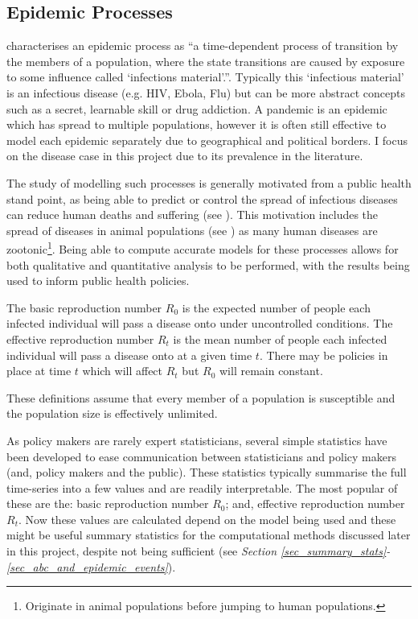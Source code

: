 \documentclass[11pt,a4paper]{article}
\theoremstyle{break}
\begin{document}
\subsection{Epidemic Processes}

  \par \cite[]{epidemic_process_in_an_open_population} characterises an epidemic process as ``a time-dependent process of transition by the members of a population, where the state transitions are caused by exposure to some influence called `infections material'.''. Typically this `infectious material' is an infectious disease (e.g. HIV, Ebola, Flu) but can be more abstract concepts such as a secret, learnable skill or drug addiction. A pandemic is an epidemic which has spread to multiple populations, however it is often still effective to model each epidemic separately due to geographical and political borders. I focus on the disease case in this project due to its prevalence in the literature.

  \par The study of modelling such processes is generally motivated from a public health stand point, as being able to predict or control the spread of infectious diseases can reduce human deaths and suffering (see \cite[]{mitigation_measures_for_pandemic_influence_in_italy}). This motivation includes the spread of diseases in animal populations (see \cite[]{dynamic_model_of_bovine_tb_spread_and_control_in_great_britain}) as many human diseases are zootonic\footnote{Originate in animal populations before jumping to human populations.}. Being able to compute accurate models for these processes allows for both qualitative and quantitative analysis to be performed, with the results being used to inform public health policies.

  \begin{box_definition}
    The basic reproduction number $R_0$ is the expected number of people each infected individual will pass a disease onto under uncontrolled conditions. The effective reproduction number $R_t$ is the mean number of people each infected individual will pass a disease onto at a given time $t$. There may be policies in place at time $t$ which will affect $R_t$ but $R_0$ will remain constant.
    \par These definitions assume that every member of a population is susceptible and the population size is effectively unlimited.
  \end{box_definition}

  \par As policy makers are rarely expert statisticians, several simple statistics have been developed to ease communication between statisticians and policy makers (and, policy makers and the public). These statistics typically summarise the full time-series into a few values and are readily interpretable. The most popular of these are the: basic reproduction number $R_0$; and, effective reproduction number $R_t$. Now these values are calculated depend on the model being used and these might be useful summary statistics for the computational methods discussed later in this project, despite not being sufficient (see \textit{Section \ref{sec_summary_stats}-\ref{sec_abc_and_epidemic_events}}).
\end{document}
